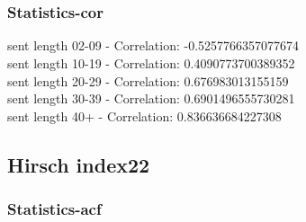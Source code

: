 \documentclass{article}%
\begin{document}
\begin{figure}[ht]%
\centering%
\setlength{\abovecaptionskip}{-35pt}%
%
%
\\%
%
%
\\%
%
\end{figure}

%
\newpage%
\subsubsection{Statistics{-}cor}%
\label{ssubsec:Statistics{-}cor}%
\noindent%
sent length 02-09 - Correlation: -0.5257766357077674\\%
sent length 10-19 - Correlation: 0.4090773700389352\\%
sent length 20-29 - Correlation: 0.676983013155159\\%
sent length 30-39 - Correlation: 0.6901496555730281\\%
sent length 40+ - Correlation: 0.836636684227308\\

%
\newpage

%
\subsection{Hirsch index22}%
\label{subsec:Hirschindex22}%
\subsubsection{Statistics{-}acf}%
\label{ssubsec:Statistics{-}acf}%
\end{document}
